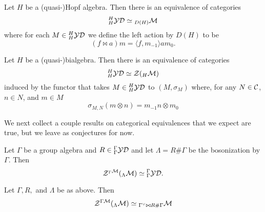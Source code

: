 \documentclass [11pt, proquest] {uwthesis}[2020/02/24]
\begin{document}
    \begin{thm}
        Let $H$ be a (quasi-)Hopf algebra. Then there is an equivalence of categories
        \[{^H_H\mathcal{Y}}\mathcal{D}\simeq {_{D(H)}\mathcal{M}}\]
        where for each $M\in {^H_H}\mathcal{Y}\mathcal{D}$ we define the left action by $D(H)$ to be
        \[(f\bowtie a)m = \langle f, m_{-1}\rangle am_0.\]
    \end{thm}
    
    \begin{thm}\label{thm:schauenburg-equiv}
        Let $H$ be a (quasi-)bialgebra. Then there is an equivalence of categories
        \[{^H_H\mathcal{Y}\mathcal{D}}\simeq\mathcal{Z}({_H\mathcal{M}})\]
        induced by the functor that takes $M\in{^H_H\mathcal{Y}\mathcal{D}}$ to $(M,\sigma_{M})$ where, for any $N\in \mathcal{C}$,  $n\in N$, and $m\in M$
        \[\sigma_{M,N}(m\otimes n)=m_{-1}n\otimes m_0\]
    \end{thm}
    
    We next collect a couple results on categorical equivalences that we expect are true, but we leave as conjectures for now.
    
    \begin{conj}
        Let $\Gamma$ be a group algebra and $R\in{^\Gamma_\Gamma\mathcal{YD}}$ and let $\Lambda=R\#\Gamma$ be the bosonization by $\Gamma.$ Then
        \[\mathcal{Z}^{_\Gamma\mathcal{M}}({_\Lambda\mathcal{M}})\simeq {^\Gamma_\Gamma\mathcal{YD}}.\]
    \end{conj}
    
    \begin{conj}
        Let $\Gamma, R,$ and $\Lambda$ be as above. Then \[\mathcal{Z}^{\Gamma\mathcal{M}}({_\Lambda\mathcal{M}})\simeq{_{\Gamma^\vee\bowtie R\#\Gamma}\mathcal{M}}\]
    \end{conj}
    
    
\end{document}
